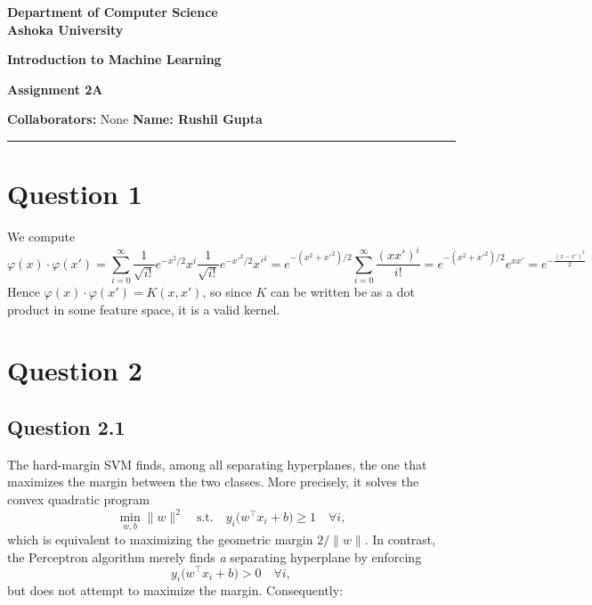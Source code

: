 \documentclass[a4paper]{article}
\begin{document}
\begin{center}
{\large \bf \color{red} Department of Computer Science} \\
{\large \bf \color{red} Ashoka University} \\

\vspace{0.1in}

{\large \bf \color{blue} Introduction to Machine Learning}

\vspace{0.05in}

{ \bf \color{YellowOrange} Assignment 2A}
\end{center}
\medskip

{\textbf{Collaborators:} None} \hfill {\textbf{Name: Rushil Gupta} }

\bigskip
\hrule

\section*{Question 1}
We compute
  \[
    \varphi(x)\cdot \varphi(x')
     = \sum_{i=0}^\infty \frac{1}{\sqrt{i!}}e^{-x^2/2}x^i \frac{1}{\sqrt{i!}}e^{-x'^2/2}x'^i
     = e^{-(x^2+x'^2)/2}\sum_{i=0}^\infty \frac{(xx')^i}{i!}
     = e^{-(x^2+x'^2)/2}e^{xx'}
     = e^{-\frac{(x-x')^2}{2}}
  \]
  Hence
  \(\varphi(x)\cdot \varphi(x')=K(x,x')\), so since \(K\) can be written be as a dot product in some feature space, it is a valid kernel.


\newpage
\section*{Question 2}
\subsection*{Question 2.1}
The hard-margin SVM finds, among all separating hyperplanes, the one that maximizes the margin between the two classes.  More precisely, it solves the convex quadratic program
\[
\min_{w,b} \|w\|^2
\quad\text{s.t.}\quad
y_i\bigl(w^\top x_i + b\bigr) \ge 1
\quad\forall i,
\]
which is equivalent to maximizing the geometric margin \(2/\|w\|\).  In contrast, the Perceptron algorithm merely finds \emph{a} separating hyperplane by enforcing
\[
y_i\bigl(w^\top x_i + b\bigr) > 0
\quad\forall i,
\]
but does not attempt to maximize the margin.  Consequently:
\end{document}
